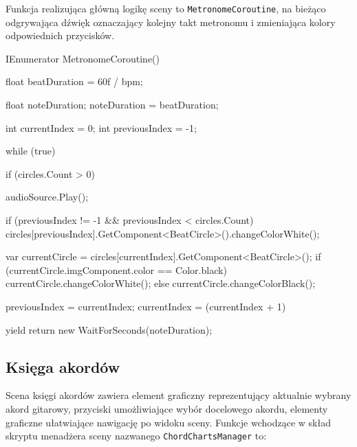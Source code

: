 Funkcja realizująca główną logikę sceny to \texttt{MetronomeCoroutine}, na bieżąco odgrywająca dźwięk oznaczający kolejny takt metronomu i zmieniająca kolory odpowiednich przycisków.
\begin{listing}[basicstyle=\footnotesize\ttfamily]
    IEnumerator MetronomeCoroutine()
    {
        
        float beatDuration = 60f / bpm;

        float noteDuration;
        noteDuration = beatDuration;

        int currentIndex = 0;
        int previousIndex = -1;

        while (true)
        {
            if (circles.Count > 0)
            {
                audioSource.Play();
                
           
                if (previousIndex != -1 && previousIndex < circles.Count)
                {
                    circles[previousIndex].GetComponent<BeatCircle>().changeColorWhite();
                }
                
                var currentCircle = circles[currentIndex].GetComponent<BeatCircle>();
                if (currentCircle.imgComponent.color == Color.black)
                {
                    currentCircle.changeColorWhite();
                }
                else
                {
                    currentCircle.changeColorBlack();
                }

                previousIndex = currentIndex;
                currentIndex = (currentIndex + 1) %
            }
            
            yield return new WaitForSeconds(noteDuration);
        }
    }
\end{listing}
\subsection{Księga akordów}

Scena księgi akordów zawiera element graficzny reprezentujący aktualnie wybrany akord gitarowy, przyciski umożliwiające wybór docelowego akordu, elementy graficzne ułatwiające nawigację po widoku sceny. Funkcje wchodzące w skład skryptu menadżera sceny nazwanego \texttt{ChordChartsManager} to:

